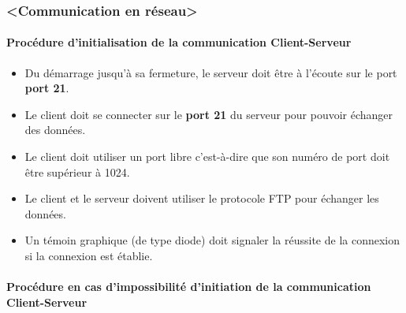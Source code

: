 \documentclass[10pt,a4paper]{report}
\begin{document}
\subsubsection{\textless Communication en réseau\textgreater}

\paragraph{\textbf{Procédure d'initialisation de la communication Client-Serveur}}

\begin{itemize}[label = $\triangleright$]
\item  Du démarrage jusqu'à sa fermeture, le serveur doit être à l'écoute sur le port \textbf{port 21}.

\item Le client doit se connecter sur le \textbf{port 21} du serveur pour pouvoir échanger des données.

\item Le client doit utiliser un port libre c'est-à-dire que son numéro de port doit être supérieur à 1024.

\item Le client et le serveur doivent utiliser le protocole FTP pour échanger les données.

\item Un témoin graphique (de type diode) doit signaler la réussite de la connexion si la connexion est établie. 
\end{itemize}

\paragraph{\textbf{Procédure en cas d'impossibilité d'initiation de la communication Client-Serveur}}
\end{document}
